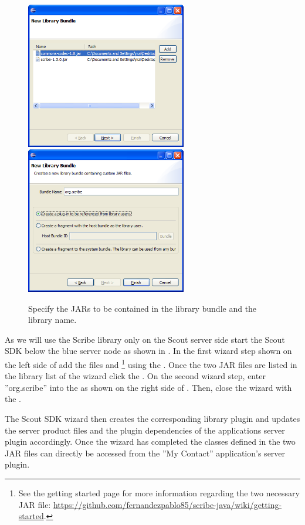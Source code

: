 \documentclass[a4paper,10pt,twoside]{book}
\begin{document}
\begin{figure}
\includegraphics[width=7cm]{new_library_scribe_1.png} \hspace{5mm}
\includegraphics[width=7cm]{new_library_scribe_2.png}
\caption{Specify the JARs to be contained in the library bundle and the library name.}
\end{figure}

As we will use the Scribe library only on the Scout server side start the Scout SDK  below the blue server node as shown in . 
In the first wizard step shown on the left side of  add the files  and \footnote{
See the getting started page for more information regarding the two necessary JAR file: \url{https://github.com/fernandezpablo85/scribe-java/wiki/getting-started}.
} 
using the . 
Once the two JAR files are listed in the library list of the wizard click the .
On the second wizard step, enter ''org.scribe'' into the  as shown on the right side of . 
Then, close the wizard with the .

The Scout SDK wizard then creates the corresponding library plugin and updates the server product files and the plugin dependencies of the applications server plugin accordingly. 
Once the wizard has completed the classes defined in the two JAR files can directly be accessed from the ''My Contact'' application's server plugin.
\end{document}
